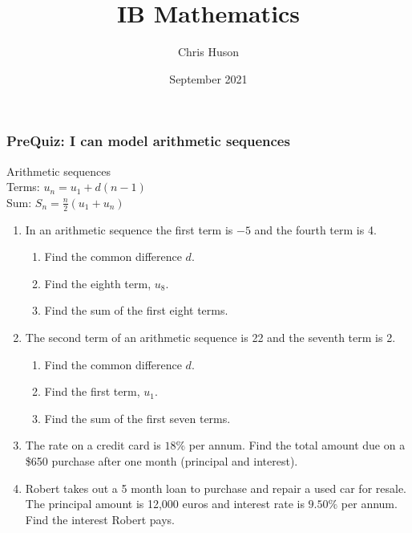 \documentclass[12pt, twoside]{article}
\title{IB Mathematics}
\author{Chris Huson}
\date{September 2021}
\begin{document}
\subsubsection*{PreQuiz: I can model arithmetic sequences}
Arithmetic sequences\\[0.25cm]
Terms: $u_n=u_1 + d(n-1)$\\[0.25cm]
Sum: $\displaystyle S_n= \frac{n}{2}(u_1 + u_n)$\\[0.25cm]

\begin{enumerate}
\item In an arithmetic sequence the first term is $-5$ and the fourth term is 4.
  \begin{enumerate}[itemsep=2cm]
    \item Find the common difference $d$.
    \item Find the eighth term, $u_{8}$.\vspace{1cm}
    \item Find the sum of the first eight terms.
  \end{enumerate} \vspace{2cm}

\item The second term of an arithmetic sequence is 22 and the seventh term is 2.
  \begin{enumerate}[itemsep=2cm]
    \item Find the common difference $d$.
    \item Find the first term, $u_{1}$.
    \item Find the sum of the first seven terms.
  \end{enumerate} \vspace{2cm}

\newpage
\item The rate on a credit card is $18\%$ per annum. Find the total amount due on a \$650 purchase after one month (principal and interest). \vspace{3cm}

\item Robert takes out a 5 month loan to purchase and repair a used car for resale. The principal amount is 12,000 euros and interest rate is $9.50\%$ per annum. Find the interest Robert pays. \vspace{3cm}


\end{enumerate}
\end{document}
